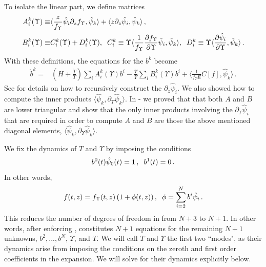 To isolate the linear part, we define matrices
\begin{align}\label{ABmatrices}
A^k_i(\Upsilon)\equiv&\langle\frac{z}{f_\Upsilon }\hat\psi_i\partial_zf_\Upsilon ,\hat\psi_k\rangle+\langle z\partial_z \hat\psi_i,\hat\psi_k\rangle\,,\\
B^k_i(\Upsilon)\equiv& C_i^k(\Upsilon)+D_i^k(\Upsilon),\hspace{2mm} C_i^k\equiv\Upsilon\langle\frac{1}{f_\Upsilon }\frac{\partial f_\Upsilon }{\partial\Upsilon}\hat\psi_i,\hat\psi_k\rangle,\hspace{2mm} D_i^k\equiv\Upsilon\langle\frac{\partial\hat{\psi}_i}{\partial \Upsilon},\hat\psi_k\rangle\,. \notag
\end{align}
 With these definitions, the equations for the $b^k$ become
\begin{align}\label{bEq}
\dot b^k=& \left(H+\frac{\dot{T}}{T}\right)\sum_i A_i^k(\Upsilon)b^i-\frac{\dot{\Upsilon}}{\Upsilon}\sum_i B_i^k(\Upsilon)b^i+\langle\frac{1}{f_\Upsilon E}C[f],\hat\psi_k\rangle\,.
\end{align}
 See   for details on how to recursively construct the $\partial_z\hat\psi_i$. We also showed how to compute the inner products $\langle\hat\psi_k,\partial_{\Upsilon}\hat\psi_k\rangle$.
 In  - we proved that that both $A$ and $B$ are lower triangular and show that the only inner products involving the $\partial_\Upsilon\hat{\psi}_i$ that are required in order to compute $A$ and $B$ are those the above mentioned diagonal elements, $\langle\hat\psi_k,\partial_{\Upsilon}\hat\psi_k\rangle$.


We fix the dynamics of $T$ and $\Upsilon$ by imposing the conditions
\begin{equation}\label{bIcs}
b^0(t)\hat\psi_0(t)=1\,,\hspace{2mm}b^1(t)=0\,.
\end{equation}
In other words,
\begin{equation}
f(t,z)=f_\Upsilon (t,z)\left(1+\phi(t,z)\right),\hspace{2mm} \phi=\sum_{i=2}^N b^i\hat\psi_i\,.
\end{equation}
This reduces the number of degrees of freedom in  from $N+3$ to $N+1$.  In other words, after enforcing ,  constitutes $N+1$ equations for the remaining $N+1$ unknowns, $b^2,...,b^N$, $\Upsilon$, and $T$.  We will call $T$ and $\Upsilon$ the first two ``modes", as their dynamics arise from imposing the conditions  on the zeroth and first order coefficients in the expansion. We will solve for their dynamics explicitly below.

